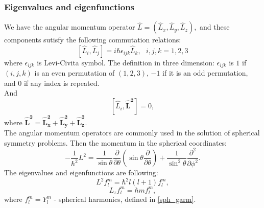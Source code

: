 \documentclass[a4paper, 12pt]{article}
\begin{document}
\subsubsection{Eigenvalues and eigenfunctions}

We have the angular momentum operator $\hat L = (\hat L_x,\hat L_y, \hat L_z),$ and these components sutisfy the following commutation relations:
\begin{equation}\label{comm_L}
	[\hat L_i, \hat L_j] =i \hbar \epsilon_{ijk}  \hat L_k, ~~~i, j, k =1,2,3
\end{equation}
where $\epsilon_{ijk}$ is Levi-Civita symbol. The definition in three dimension:  $\epsilon_{ijk}$ is $1$ if $(i, j, k)$ is an even permutation of $(1, 2, 3)$, $−1$ if it is an odd permutation, and $0$ if any index is repeated.\\
And
$$[\hat L_i, \boldsymbol{\hat L^2}] = 0, $$
where $\mathbf{\hat L^2 = \hat L_x^2+\hat L_y^2+\hat L_z^2} .$\\
The angular momentum operators are commonly used in the solution of spherical symmetry problems. Then the momentum in the spherical coordinates: 
$$-\frac{1}{\hbar^2}L^2=\frac{1}{\sin \theta}\frac{\partial}{\partial \theta}(\sin \theta \frac{\partial}{\partial \theta})+\frac{1}{\sin^2 \theta}\frac{\partial^2}{\partial \phi^2}.$$
The eigenvalues and eigenfunctions are following:
$$L^2 f_l^m = \hbar^2l(l+1) f_l^m,$$
$$L_z f_l^m = \hbar m f_l^m,$$
where $f_l^m = Y_l^m$ - spherical harmonics, defined in \eqref{sph_garm}.
\end{document}
